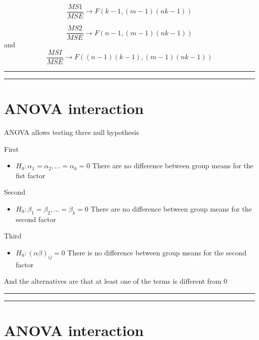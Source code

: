 \documentclass[
]{book}
\providecommand{\tightlist}{%
  \setlength{\itemsep}{0pt}\setlength{\parskip}{0pt}}
\begin{document}
\[\frac{MS1}{MSE} \rightarrow F(k-1,(m-1)(nk-1))\]

\[\frac{MS2}{MSE}\rightarrow F(n-1,(m-1)(nk-1))\]
and
\[\frac{MSI}{MSE}\rightarrow F((n-1)(k-1),(m-1)(nk-1))\]

\begin{center}\rule{0.5\linewidth}{0.5pt}\end{center}

\begin{center}\rule{0.5\linewidth}{0.5pt}\end{center}

\hypertarget{anova-interaction-4}{%
\section{ANOVA interaction}\label{anova-interaction-4}}

ANOVA allows testing three null hypothesis

First

\begin{itemize}
\tightlist
\item
  \(H_0: \alpha_1=\alpha_2, ...=\alpha_k=0\) There are no difference between group means for the fist factor
\end{itemize}

Second

\begin{itemize}
\tightlist
\item
  \(H_0: \beta_1=\beta_2, ...=\beta_k=0\) There are no difference between group means for the second factor
\end{itemize}

Third

\begin{itemize}
\tightlist
\item
  \(H_0: (\alpha\beta)_{ij}=0\) There is no difference between group means for the second factor
\end{itemize}

And the alternatives are that at least one of the terms is different from \(0\)

\begin{center}\rule{0.5\linewidth}{0.5pt}\end{center}

\begin{center}\rule{0.5\linewidth}{0.5pt}\end{center}

\hypertarget{anova-interaction-5}{%
\section{ANOVA interaction}\label{anova-interaction-5}}
\end{document}
